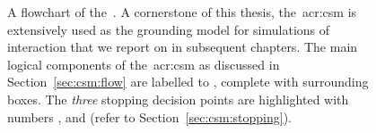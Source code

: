 \begin{figure}[t!]
    \centering
    \caption[Flowchart of the~\gls{acr:csm}]{A flowchart of the~. A cornerstone of this thesis, the~\gls{acr:csm} is extensively used as the grounding model for simulations of interaction that we report on in subsequent chapters. The main logical components of the~\gls{acr:csm} as discussed in Section~\ref{sec:csm:flow} are labelled  to , complete with surrounding boxes. The \emph{three} stopping decision points are highlighted with numbers ,  and  (refer to Section~\ref{sec:csm:stopping}).}
    \label{fig:csm}
\end{figure}

